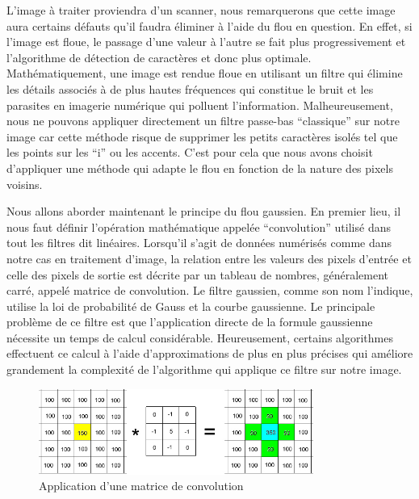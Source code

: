 \documentclass[11pt]{report}
\begin{document}
L'image à traiter proviendra d'un scanner, nous remarquerons que cette image aura certains défauts qu'il faudra éliminer à l'aide du flou en question. En effet, si l'image est floue, le passage d'une valeur à l'autre se fait plus progressivement et l'algorithme de détection de caractères et donc plus optimale. Mathématiquement, une image est rendue floue en utilisant un filtre qui élimine les détails associés à de plus hautes fréquences qui constitue le bruit et les parasites en imagerie numérique qui polluent l'information. Malheureusement, nous ne pouvons appliquer directement un filtre passe-bas ``classique'' sur notre image car cette méthode risque de supprimer les petits caractères isolés tel que les points sur les ``i'' ou les accents. C'est pour cela que nous avons choisit d'appliquer une méthode qui adapte le flou en fonction de la nature des pixels voisins.

Nous allons aborder maintenant le principe du flou gaussien. En premier lieu, il nous faut définir l'opération mathématique appelée ``convolution'' utilisé dans tout les filtres dit linéaires. Lorsqu'il s'agit de données numérisés comme dans notre cas en traitement d'image, la relation entre les valeurs des pixels d'entrée et celle des pixels de sortie est décrite par un tableau de nombres, généralement carré, appelé matrice de convolution.  Le filtre gaussien, comme son nom l'indique, utilise la loi de probabilité de Gauss et la courbe gaussienne. Le principale problème de ce filtre est que l'application directe de la formule gaussienne nécessite un temps de calcul considérable. Heureusement, certains algorithmes effectuent ce calcul à l'aide d'approximations de plus en plus précises qui améliore grandement la complexité de l'algorithme qui applique ce filtre sur notre image.

\begin{figure}[htbp]
\centering
\includegraphics[width=9cm]{matconvol.jpg}
\caption{Application d'une matrice de convolution}
\end{figure}
\end{document}
